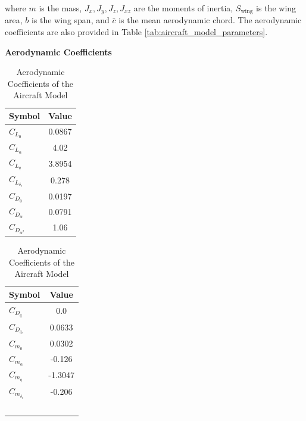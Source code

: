 \documentclass[journal,article,submit,pdftex,moreauthors]{Definitions/mdpi}
\begin{document}
where \(m\) is the mass, \(J_x, J_y, J_z, J_{xz}\) are the moments of inertia, \(S_{\text{wing}}\) is the wing area, \(b\) is the wing span, and \(\bar{c}\) is the mean aerodynamic chord. The aerodynamic coefficients are also provided in Table \ref{tab:aircraft_model_parameters}.

\begin{table}[H]
    \centering
    \label{tab:aero_coefficients}
    \textbf{Aerodynamic Coefficients} \\ %
    \vspace{0.5cm} %
    \begin{adjustbox}{valign=t}
    \begin{minipage}[t]{0.45\textwidth} %
        \centering
        \begin{tabular}{|l|c|}
            \hline
            \textbf{Symbol} & \textbf{Value} \\ \hline
            \( C_{L_0} \) & 0.0867 \\ \hline
            \( C_{L_\alpha} \) & 4.02 \\ \hline
            \( C_{L_q} \) & 3.8954 \\ \hline
            \( C_{L_{\delta_e}} \) & 0.278 \\ \hline
            \( C_{D_0} \) & 0.0197 \\ \hline
            \( C_{D_\alpha} \) & 0.0791 \\ \hline
            \( C_{D_{\alpha^2}} \) & 1.06 \\ \hline
        \end{tabular}
    \end{minipage}
    \end{adjustbox}
    \hfill
    \begin{adjustbox}{valign=t}
    \begin{minipage}[t]{0.45\textwidth} %
        \centering
        \begin{tabular}{|l|c|}
            \hline
            \textbf{Symbol} & \textbf{Value} \\ \hline
            \( C_{D_q} \) & 0.0 \\ \hline
            \( C_{D_{\delta_e}} \) & 0.0633 \\ \hline
            \( C_{m_0} \) & 0.0302 \\ \hline
            \( C_{m_\alpha} \) & -0.126 \\ \hline
            \( C_{m_q} \) & -1.3047 \\ \hline
            \( C_{m_{\delta_e}} \) & -0.206 \\ \hline
            \( \) & \( \) \\ \hline %
        \end{tabular}
    \end{minipage}
    \end{adjustbox}
    \caption{Aerodynamic Coefficients of the Aircraft Model}
\end{table}
\end{document}
